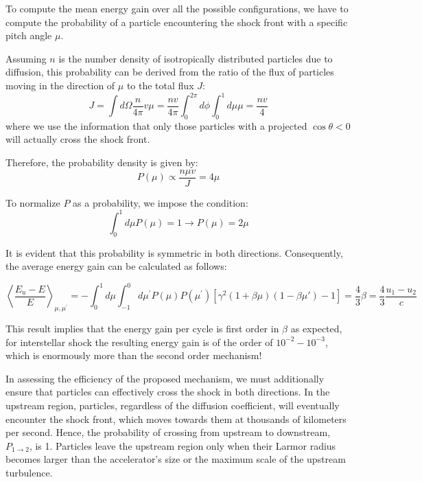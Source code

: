 To compute the mean energy gain over all the possible configurations, we have to compute the probability of a particle encountering the shock front with a specific pitch angle \( \mu \). 

Assuming \( n \) is the number density of isotropically distributed particles due to diffusion, this probability can be derived from the ratio of the flux of particles moving in the direction of \( \mu \) to the total flux \( J \):
%
\begin{equation}
J = \int d\Omega \frac{n}{4\pi} v \mu = \frac{n v}{4\pi} \int_0^{2\pi} d\phi \int_0^1 d\mu \mu = \frac{n v}{4}
\end{equation}
%
where we use the information that only those particles with a projected \( \cos \theta < 0 \) will actually cross the shock front.

Therefore, the probability density is given by:
%
\begin{equation}
P(\mu) \propto \frac{n \mu v}{J} = 4 \mu
\end{equation}

To normalize \( P \) as a probability, we impose the condition:
%
\begin{equation}
\int_0^1 d\mu P(\mu) = 1 \rightarrow P(\mu) = 2\mu 
\end{equation}

It is evident that this probability is symmetric in both directions. Consequently, the average energy gain can be calculated as follows:
%
\begin{remark}
\begin{equation}
\left\langle \frac{E_u -E}{E} \right\rangle_{\mu,\mu^\prime} = -\int_0^1 d\mu \int_{-1}^0 d\mu^\prime P(\mu)P(\mu^\prime)\left[ \gamma^2(1+\beta\mu)(1-\beta\mu')-1 \right] = \frac{4}{3} \beta = \frac{4}{3} \frac{u_1-u_2}{c}
\end{equation}
\end{remark}

This result implies that the energy gain per cycle is first order in $\beta$ as expected, for interstellar shock the resulting energy gain is of the order of \( 10^{-2}-10^{-3} \), which is enormously more than the second order mechanism! 

In assessing the efficiency of the proposed mechanism, we must additionally ensure that particles can effectively cross the shock in both directions. 
%
In the upstream region, particles, regardless of the diffusion coefficient, will eventually encounter the shock front, which moves towards them at thousands of kilometers per second. Hence, the probability of crossing from upstream to downstream, \( P_{1 \rightarrow 2} \), is 1. Particles leave the upstream region only when their Larmor radius becomes larger than the accelerator's size or the maximum scale of the upstream turbulence.

